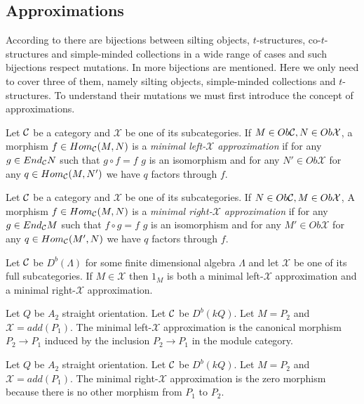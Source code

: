 \subsection{Approximations}
\indent According to \cite{KY12} there are bijections between silting objects, $t$-structures, co-$t$-structures and simple-minded collections in a wide range of cases and such bijections respect mutations. In \cite{BY13} more bijections are mentioned. Here we only need to cover three of them, namely silting objects, simple-minded collections and $t$-structures. To understand their mutations we must first introduce the concept of approximations.\\
\begin{definition}
Let $\mathcal{C}$ be a category and $\mathcal{X}$ be one of its subcategories. If $M\in Ob\mathcal{C}, N\in Ob\mathcal{X}$, a morphism $f\in Hom_{\mathcal{C}}(M,N)$ is a \textit{minimal left-$\mathcal{X}$ approximation} if for any $g\in End_{\mathcal{C}} N$ such that $g\circ f = f$ $g$ is an isomorphism and for any $N'\in Ob\mathcal{X}$ for any $q\in Hom_{\mathcal{C}}(M,N')$ we have $q$ factors through $f$.\\
\end{definition}
\begin{definition}
Let $\mathcal{C}$ be a category and $\mathcal{X}$ be one of its subcategories. If $N\in Ob\mathcal{C}, M\in Ob\mathcal{X}$, A morphism $f\in Hom_{\mathcal{C}}(M,N)$ is a \textit{minimal right-$\mathcal{X}$ approximation} if for any $g\in End_{\mathcal{C}} M$ such that $f\circ g = f$ $g$ is an isomorphism and for any $M'\in Ob\mathcal{X}$ for any $q\in Hom_{\mathcal{C}}(M',N)$ we have $q$ factors through $f$.\\
\end{definition}
\begin{example}
Let $\mathcal{C}$ be $D^b(\Lambda)$ for some finite dimensional algebra $\Lambda$ and let $\mathcal{X}$ be one of its full subcategories. If $M\in\mathcal{X}$ then $1_M$ is both a minimal left-$\mathcal{X}$ approximation and a minimal right-$\mathcal{X}$ approximation.
\end{example}
\begin{example}
Let $Q$ be $A_2$ straight orientation. Let $\mathcal{C}$ be $D^b(kQ)$. Let $M = P_2$ and $\mathcal{X} = add(P_1)$. The minimal left-$\mathcal{X}$ approximation is the canonical morphism $P_2\to P_1$ induced by the inclusion $P_2\to P_1$ in the module category.
\end{example}
\begin{example}
Let $Q$ be $A_2$ straight orientation. Let $\mathcal{C}$ be $D^b(kQ)$. Let $M = P_2$ and $\mathcal{X} = add(P_1)$. The minimal right-$\mathcal{X}$ approximation is the zero morphism because there is no other morphism from $P_1$ to $P_2$.
\end{example}
